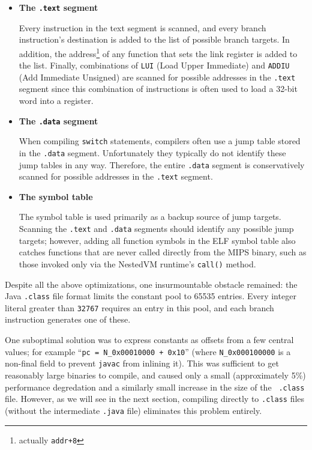 \documentclass{acmconf}
\begin{document}
\begin{itemize}

\item {\bf The {\tt .text} segment}

      Every instruction in the text segment is scanned, and every
      branch instruction's destination is added to the list of
      possible branch targets.  In addition, the
      address\footnote{actually {\tt addr+8}} of any function that
      sets the link register is added to the list.  Finally,
      combinations of {\tt LUI} (Load Upper Immediate) and {\tt ADDIU}
      (Add Immediate Unsigned) are scanned for possible addresses in
      the {\tt .text} segment since this combination of instructions
      is often used to load a 32-bit word into a register.

\item {\bf The {\tt .data} segment}

      When compiling {\tt switch} statements, compilers often use a
      jump table stored in the {\tt .data} segment.  Unfortunately
      they typically do not identify these jump tables in any way.
      Therefore, the entire {\tt .data} segment is conservatively
      scanned for possible addresses in the {\tt .text} segment.
      
\item {\bf The symbol table}

      The symbol table is used primarily as a backup source of jump
      targets.  Scanning the {\tt .text} and {\tt .data} segments
      should identify any possible jump targets; however, adding all
      function symbols in the ELF symbol table also catches functions
      that are never called directly from the MIPS binary, such as
      those invoked only via the NestedVM runtime's {\tt call()}
      method.

\end{itemize}

Despite all the above optimizations, one insurmountable obstacle
remained: the Java {\tt .class} file format limits the constant pool
to 65535 entries.  Every integer literal greater than {\tt 32767}
requires an entry in this pool, and each branch instruction generates
one of these.

One suboptimal solution was to express constants as offsets from a few
central values; for example ``{\tt pc~=~N\_0x00010000~+~0x10}'' (where
{\tt N\_0x000100000} is a non-final field to prevent {\tt javac} from
inlining it).  This was sufficient to get reasonably large binaries to
compile, and caused only a small (approximately 5\%) performance
degredation and a similarly small increase in the size of the {\tt
.class} file.  However, as we will see in the next section, compiling
directly to {\tt .class} files (without the intermediate {\tt .java}
file) eliminates this problem entirely.
\end{document}
